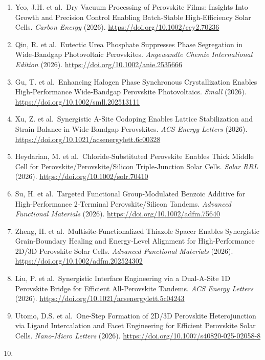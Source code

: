 \documentclass[
  11pt,
]{article}
\begin{document}
\begin{enumerate}
  thermal-mechanical cycling resistance. \emph{Nature Communications}
  (2026). \url{https://doi.org/10.1038/s41467-026-74285-5}
\item
  Yeo, J.H. et al.~Dry Vacuum Processing of Perovskite Films: Insights
  Into Growth and Precision Control Enabling Batch‐Stable
  High‐Efficiency Solar Cells. \emph{Carbon Energy} (2026).
  \url{https://doi.org/10.1002/cey2.70236}
\item
  Qin, R. et al.~Eutectic Urea Phosphate Suppresses Phase Segregation in
  Wide‐Bandgap Photovoltaic Perovskites. \emph{Angewandte Chemie
  International Edition} (2026).
  \url{https://doi.org/10.1002/anie.2535666}
\item
  Gu, T. et al.~Enhancing Halogen Phase Synchronous Crystallization
  Enables High‐Performance Wide‐Bandgap Perovskite Photovoltaics.
  \emph{Small} (2026). \url{https://doi.org/10.1002/smll.202513111}
\item
  Xu, Z. et al.~Synergistic A-Site Codoping Enables Lattice
  Stabilization and Strain Balance in Wide-Bandgap Perovskites.
  \emph{ACS Energy Letters} (2026).
  \url{https://doi.org/10.1021/acsenergylett.6c00328}
\item
  Heydarian, M. et al.~Chloride‐Substituted Perovskite Enables Thick
  Middle Cell for Perovskite/Perovskite/Silicon Triple‐Junction Solar
  Cells. \emph{Solar RRL} (2026).
  \url{https://doi.org/10.1002/solr.70410}
\item
  Su, H. et al.~Targeted Functional Group‐Modulated Benzoic Additive for
  High‐Performance 2‐Terminal Perovskite/Silicon Tandems. \emph{Advanced
  Functional Materials} (2026). \url{https://doi.org/10.1002/adfm.75640}
\item
  Zheng, H. et al.~Multisite‐Functionalized Thiazole Spacer Enables
  Synergistic Grain‐Boundary Healing and Energy‐Level Alignment for
  High‐Performance 2D/3D Perovskite Solar Cells. \emph{Advanced
  Functional Materials} (2026).
  \url{https://doi.org/10.1002/adfm.202524302}
\item
  Liu, P. et al.~Synergistic Interface Engineering via a Dual-A-Site 1D
  Perovskite Bridge for Efficient All-Perovskite Tandems. \emph{ACS
  Energy Letters} (2026).
  \url{https://doi.org/10.1021/acsenergylett.5c04243}
\item
  Utomo, D.S. et al.~One-Step Formation of 2D/3D Perovskite
  Heterojunction via Ligand Intercalation and Facet Engineering for
  Efficient Perovskite Solar Cells. \emph{Nano-Micro Letters} (2026).
  \url{https://doi.org/10.1007/s40820-025-02058-8}
\item

\end{enumerate}
\end{document}

